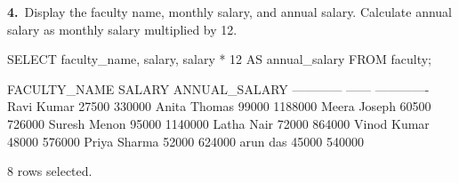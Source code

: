 \noindent\begin{minipage}{\linewidth}
\begingroup{}
{\fontsize{14}{17}\selectfont\textbf{4.}}\ Display the faculty name, monthly salary, and annual salary. Calculate annual salary as monthly salary multiplied by 12.\par
\endgroup\vspace{12pt}


\begin{sqlcode}
SELECT faculty_name, salary, salary * 12 AS annual_salary
FROM faculty;
\end{sqlcode}

\vspace{18pt}


\begin{sqlout}[fontsize=\small]
FACULTY_NAME  SALARY  ANNUAL_SALARY
------------  ------  -------------
Ravi Kumar     27500         330000
Anita Thomas   99000        1188000
Meera Joseph   60500         726000
Suresh Menon   95000        1140000
Latha Nair     72000         864000
Vinod Kumar    48000         576000
Priya Sharma   52000         624000
arun das       45000         540000

8 rows selected.
\end{sqlout}
\end{minipage}\par\vspace{24pt}


